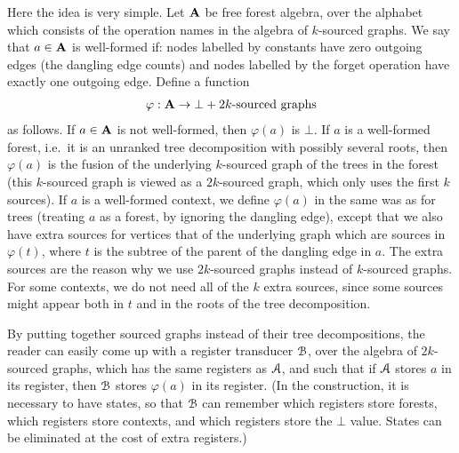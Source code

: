 Here the idea is very simple. Let $\mathbf{A}$ be free forest algebra, over the alphabet which consists of the operation names in the algebra of $k$-sourced graphs. We say that $a \in \mathbf{A}$ is well-formed if: nodes labelled by constants have zero outgoing edges (the dangling edge counts) and nodes labelled by the forget operation have exactly one outgoing edge. Define a function
\begin{align*}
    \varphi : \mathbf{A} \to \bot + \text{$2k$-sourced graphs}
\end{align*}
as follows. If $a \in \mathbf{A}$ is not well-formed, then $\varphi(a)$ is $\bot$. If $a$ is a well-formed forest, i.e.~it is an unranked tree decomposition with possibly several roots, then $\varphi(a)$ is the fusion of the  underlying $k$-sourced graph of the trees in the forest (this $k$-sourced graph is viewed as a $2k$-sourced graph, which only uses the first $k$ sources). If $a$ is a well-formed context, we define $\varphi(a)$ in the same was as for trees (treating $a$ as a forest, by ignoring the dangling edge), except that we also have  extra sources for vertices that of the underlying graph which are sources in $\varphi(t)$, where $t$ is the subtree of the parent of the dangling edge in $a$. The extra sources are the reason why we use $2k$-sourced graphs instead of $k$-sourced graphs. For some contexts, we do not need all of the $k$ extra sources, since some sources might appear both in $t$ and in the roots of the tree decomposition.

By putting together sourced graphs instead of their tree decompositions, the reader can easily come up with a register transducer ${\mathcal B}$, over the algebra of $2k$-sourced graphs, which has the same registers as ${{\mathcal A}}$, and such that if ${{\mathcal A}}$ stores $a$ in its register, then ${\mathcal B}$ stores $\varphi(a)$ in its register. (In the construction, it is necessary to have states, so that ${\mathcal B}$ can remember which registers store forests, which registers store contexts, and which registers store the $\bot$ value. States can be eliminated at the cost of extra registers.)

